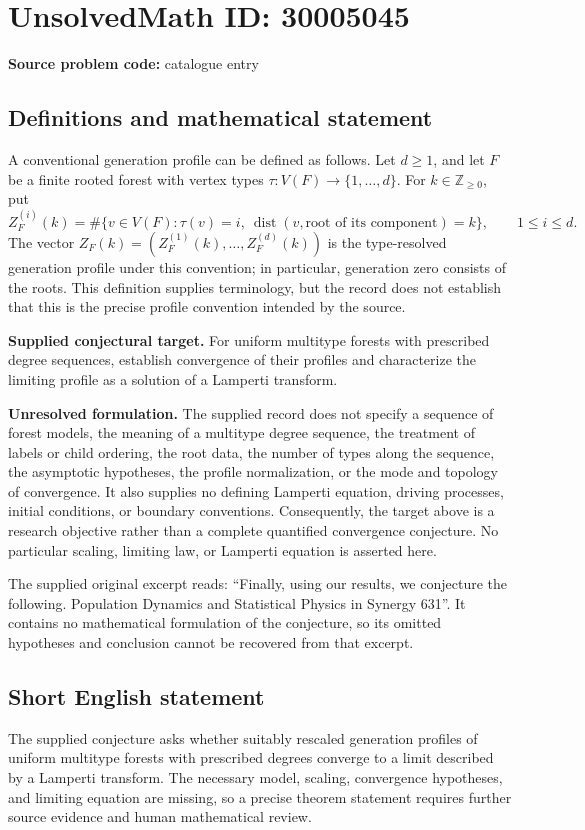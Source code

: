 \documentclass[11pt]{article}
\newcommand{\Z}{\mathbb{Z}}
\begin{document}
\section*{UnsolvedMath ID: 30005045}
\textbf{Source problem code:} catalogue entry
\subsection{Definitions and mathematical statement}
A conventional generation profile can be defined as follows. Let \(d\geq 1\), and let \(F\) be a finite rooted forest with vertex types \(\tau:V(F)\to\{1,\ldots,d\}\). For \(k\in\Z_{\geq0}\), put
\[
Z_F^{(i)}(k)=\#\{v\in V(F):\tau(v)=i,\ \operatorname{dist}(v,\text{root of its component})=k\},\qquad 1\leq i\leq d.
\]
The vector \(Z_F(k)=(Z_F^{(1)}(k),\ldots,Z_F^{(d)}(k))\) is the type-resolved generation profile under this convention; in particular, generation zero consists of the roots. This definition supplies terminology, but the record does not establish that this is the precise profile convention intended by the source.

\textbf{Supplied conjectural target.} For uniform multitype forests with prescribed degree sequences, establish convergence of their profiles and characterize the limiting profile as a solution of a Lamperti transform.

\textbf{Unresolved formulation.} The supplied record does not specify a sequence of forest models, the meaning of a multitype degree sequence, the treatment of labels or child ordering, the root data, the number of types along the sequence, the asymptotic hypotheses, the profile normalization, or the mode and topology of convergence. It also supplies no defining Lamperti equation, driving processes, initial conditions, or boundary conventions. Consequently, the target above is a research objective rather than a complete quantified convergence conjecture. No particular scaling, limiting law, or Lamperti equation is asserted here.

The supplied original excerpt reads: ``Finally, using our results, we conjecture the following. Population Dynamics and Statistical Physics in Synergy 631''. It contains no mathematical formulation of the conjecture, so its omitted hypotheses and conclusion cannot be recovered from that excerpt.
\subsection{Short English statement}
The supplied conjecture asks whether suitably rescaled generation profiles of uniform multitype forests with prescribed degrees converge to a limit described by a Lamperti transform. The necessary model, scaling, convergence hypotheses, and limiting equation are missing, so a precise theorem statement requires further source evidence and human mathematical review.
\end{document}
